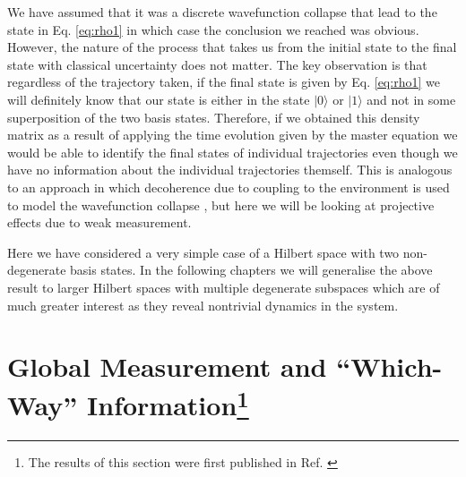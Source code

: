 We have assumed that it was a discrete wavefunction collapse that lead
to the state in Eq. \eqref{eq:rho1} in which case the conclusion we
reached was obvious. However, the nature of the process that takes us
from the initial state to the final state with classical uncertainty
does not matter. The key observation is that regardless of the
trajectory taken, if the final state is given by Eq. \eqref{eq:rho1}
we will definitely know that our state is either in the state
$| 0 \rangle$ or $| 1 \rangle$ and not in some superposition of the
two basis states. Therefore, if we obtained this density matrix as a
result of applying the time evolution given by the master equation we
would be able to identify the final states of individual trajectories
even though we have no information about the individual trajectories
themself. This is analogous to an approach in which decoherence due to
coupling to the environment is used to model the wavefunction collapse
\cite{zurek2002}, but here we will be looking at projective effects
due to weak measurement.

Here we have considered a very simple case of a Hilbert space with two
non-degenerate basis states. In the following chapters we will
generalise the above result to larger Hilbert spaces with multiple
degenerate subspaces which are of much greater interest as they reveal
nontrivial dynamics in the system.

\section[Global Measurement and ``Which-Way'' Information]
        {Global Measurement and ``Which-Way'' Information\footnote{The
            results of this section were first published in
            Ref. \cite{elliott2015}}}
\label{sec:modes}


